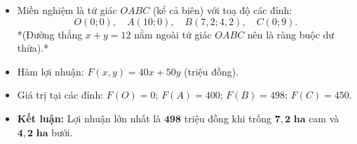 \documentclass[12pt,a4paper]{article}
\begin{document}
\vspace{0.2cm}
\begin{itemize}[leftmargin=1.5em, itemsep=3pt]
    \item Miền nghiệm là tứ giác $OABC$ (kể cả biên) với toạ độ các đỉnh:
    \[
    O(0;0), \quad A(10;0), \quad B(7{,}2; 4{,}2), \quad C(0;9).
    \]
    *(Đường thẳng $x + y = 12$ nằm ngoài tứ giác $OABC$ nên là ràng buộc dư thừa).*
    \item Hàm lợi nhuận: $F(x, y) = 40x + 50y$ (triệu đồng).
    \item Giá trị tại các đỉnh: $F(O) = 0$; $F(A) = 400$; $F(B) = 498$; $F(C) = 450$.
    \item \textbf{Kết luận:} Lợi nhuận lớn nhất là $\mathbf{498}$ triệu đồng khi trồng $\mathbf{7{,}2\text{ ha}}$ cam và $\mathbf{4{,}2\text{ ha}}$ bưởi.
\end{itemize}
\end{document}
